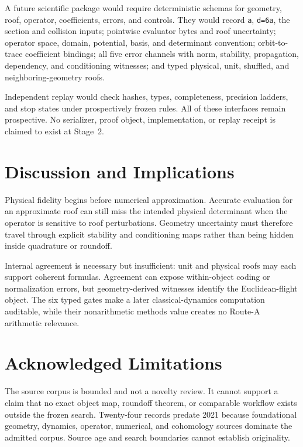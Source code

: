 \documentclass[11pt,a4paper]{article}
\begin{document}
A future scientific package would require deterministic schemas for geometry, roof, operator, coefficients, errors, and controls. They would record \texttt{a}, \texttt{d=6a}, the section and collision inputs; pointwise evaluator bytes and roof uncertainty; operator space, domain, potential, basis, and determinant convention; orbit-to-trace coefficient bindings; all five error channels with norm, stability, propagation, dependency, and conditioning witnesses; and typed physical, unit, shuffled, and neighboring-geometry roofs.

Independent replay would check hashes, types, completeness, precision ladders, and stop states under prospectively frozen rules. All of these interfaces remain prospective. No serializer, proof object, implementation, or replay receipt is claimed to exist at Stage~2.

\section{Discussion and Implications}

Physical fidelity begins before numerical approximation. Accurate evaluation for an approximate roof can still miss the intended physical determinant when the operator is sensitive to roof perturbations. Geometry uncertainty must therefore travel through explicit stability and conditioning maps rather than being hidden inside quadrature or roundoff.

Internal agreement is necessary but insufficient: unit and physical roofs may each support coherent formulas. Agreement can expose within-object coding or normalization errors, but geometry-derived witnesses identify the Euclidean-flight object. The six typed gates make a later classical-dynamics computation auditable, while their nonarithmetic methods value creates no Route-A arithmetic relevance.

\section{Acknowledged Limitations}

The source corpus is bounded and not a novelty review. It cannot support a claim that no exact object map, roundoff theorem, or comparable workflow exists outside the frozen search. Twenty-four records predate 2021 because foundational geometry, dynamics, operator, numerical, and cohomology sources dominate the admitted corpus. Source age and search boundaries cannot establish originality.
\end{document}
